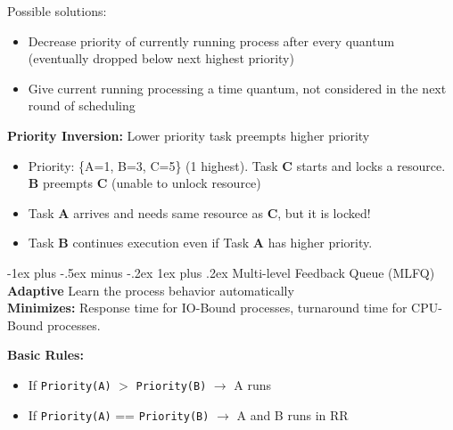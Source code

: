 \documentclass[10pt,landscape]{article}
\makeatletter
\renewcommand{\subsubsection}{\@startsection{subsubsection}{3}{0mm}%
                                {-1ex plus -.5ex minus -.2ex}%
                                {1ex plus .2ex}%
                                {\normalfont\small\bfseries}}
\makeatother
\begin{document}
\begin{multicols*}{3}

Possible solutions:
\begin{itemize}[topsep=0pt,noitemsep,wide=0pt, leftmargin=\dimexpr{} + 2\relax, topsep=0pt]
    \item Decrease priority of currently running process after every quantum (eventually dropped below next highest priority)
    \item Give current running processing a time quantum, not considered in the next round of scheduling
\end{itemize}

\textbf{Priority Inversion:} Lower priority task preempts higher priority \\ 

\begin{itemize}[topsep=0pt,noitemsep,wide=0pt, leftmargin=\dimexpr{} + 2\relax, topsep=0pt]
    \item Priority: \{A=1, B=3, C=5\} (1 highest). Task \textbf{C} starts and locks a resource. \textbf{B} preempts \textbf{C} (unable to unlock resource)\\
    \item Task \textbf{A} arrives and needs same resource as \textbf{C}, but it is locked! 
    \item Task \textbf{B} continues execution even if Task \textbf{A} has higher priority.
\end{itemize}

\subsubsection{Multi-level Feedback Queue (MLFQ)}
\textbf{Adaptive} Learn the process behavior automatically \\
\textbf{Minimizes:} Response time for IO-Bound processes, turnaround time for CPU-Bound processes.

\textbf{Basic Rules:}
\begin{itemize}[topsep=0pt,noitemsep,wide=0pt, leftmargin=\dimexpr{} + 2\relax]
    \item If \verb|Priority(A)| $>$ \verb|Priority(B)| $\rightarrow$ A runs
    \item If \verb|Priority(A)| == \verb|Priority(B)| $\rightarrow$ A and B runs in RR
\end{itemize}


\end{multicols*}
\end{document}
